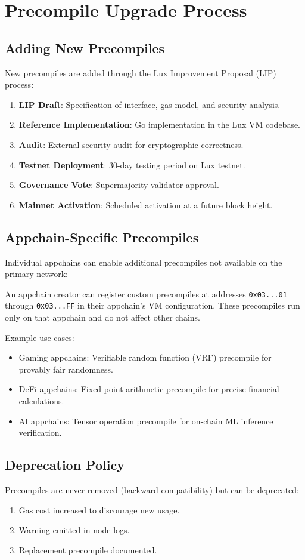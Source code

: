 \section{Precompile Upgrade Process}
\label{sec:upgrade}

\subsection{Adding New Precompiles}

New precompiles are added through the Lux Improvement Proposal (LIP) process:

\begin{enumerate}
    \item \textbf{LIP Draft}: Specification of interface, gas model, and security analysis.
    \item \textbf{Reference Implementation}: Go implementation in the Lux VM codebase.
    \item \textbf{Audit}: External security audit for cryptographic correctness.
    \item \textbf{Testnet Deployment}: 30-day testing period on Lux testnet.
    \item \textbf{Governance Vote}: Supermajority validator approval.
    \item \textbf{Mainnet Activation}: Scheduled activation at a future block height.
\end{enumerate}

\subsection{Appchain-Specific Precompiles}

Individual appchains can enable additional precompiles not available on the primary network:

\begin{definition}
An appchain creator can register custom precompiles at addresses \texttt{0x03...01} through \texttt{0x03...FF} in their appchain's VM configuration. These precompiles run only on that appchain and do not affect other chains.
\end{definition}

Example use cases:
\begin{itemize}
    \item Gaming appchains: Verifiable random function (VRF) precompile for provably fair randomness.
    \item DeFi appchains: Fixed-point arithmetic precompile for precise financial calculations.
    \item AI appchains: Tensor operation precompile for on-chain ML inference verification.
\end{itemize}

\subsection{Deprecation Policy}

Precompiles are never removed (backward compatibility) but can be deprecated:
\begin{enumerate}
    \item Gas cost increased to discourage new usage.
    \item Warning emitted in node logs.
    \item Replacement precompile documented.
\end{enumerate}


